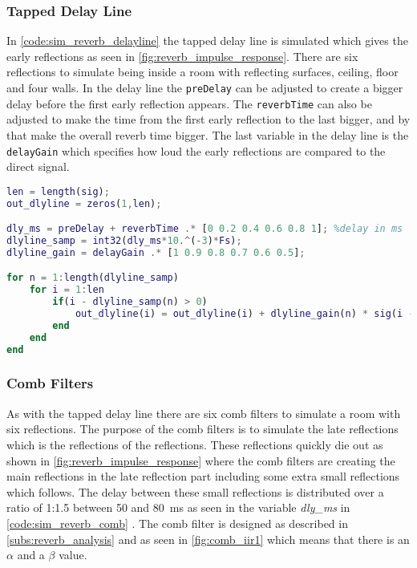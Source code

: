 \subsubsection{Tapped Delay Line}

In \autoref{code:sim_reverb_delayline} the tapped delay line is simulated which gives the early reflections as seen in \autoref{fig:reverb_impulse_response}. There are six reflections to simulate being inside a room with reflecting surfaces, ceiling, floor and four walls. In the delay line the \texttt{preDelay} can be adjusted to create a bigger delay before the first early reflection appears. The \texttt{reverbTime} can also be adjusted to make the time from the first early reflection to the last bigger, and by that make the overall reverb time bigger. The last variable in the delay line is the \texttt{delayGain} which specifies how loud the early reflections are compared to the direct signal.

\begin{lstlisting}[caption={Simulation of the tapped delay line.},language=MATLAB,label={code:sim_reverb_delayline},tabsize=2]
%delayline
len = length(sig);
out_dlyline = zeros(1,len);

dly_ms = preDelay + reverbTime .* [0 0.2 0.4 0.6 0.8 1]; %delay in ms
dlyline_samp = int32(dly_ms*10.^(-3)*Fs);
dlyline_gain = delayGain .* [1 0.9 0.8 0.7 0.6 0.5];

for n = 1:length(dlyline_samp)
    for i = 1:len
        if(i - dlyline_samp(n) > 0)
            out_dlyline(i) = out_dlyline(i) + dlyline_gain(n) * sig(i - dlyline_samp(n));
        end
    end
end
\end{lstlisting}

\subsubsection{Comb Filters}
As with the tapped delay line there are six comb filters to simulate a room with six reflections. The purpose of the comb filters is to simulate the late reflections which is the reflections of the reflections. These reflections quickly die out as shown in \autoref{fig:reverb_impulse_response} where the comb filters are creating the main reflections in the late reflection part including some extra small reflections which follows. The delay between these small reflections is distributed over a ratio of 1:1.5 between 50 and \SI{80}{\milli\second} as seen in the variable \textit{dly_ms} in \autoref{code:sim_reverb_comb} \citep{DAFX}. The comb filter is designed as described in \autoref{subs:reverb_analysis} and as seen in \autoref{fig:comb_iir1} which means that there is an $\alpha$ and a $\beta$ value.

